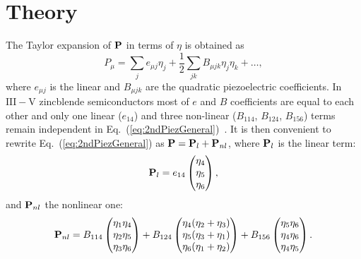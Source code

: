





\section{Theory}

The Taylor expansion of ${\bf P}$ in terms of $\eta$ is obtained as
%
\begin{equation}
\label{eq:2ndPiezGeneral}
P_{\mu}=\sum_je_{\mu j}\eta_j+\frac{1}{2}\sum_{jk}B_{\mu jk}\eta_j\eta_k+\dots,
\end{equation}
%
where $e_{\mu j}$ is the linear and $B_{\mu jk}$ are the quadratic piezoelectric coefficients. In $\mathrm{III-V}$ zincblende semiconductors most of $e$ and $B$ coefficients are equal to each other and only one linear ($e_{14}$) and three non-linear ($B_{114}$, $B_{124}$, $B_{156}$) terms remain independent in Eq.~(\ref{eq:2ndPiezGeneral})~\cite{Beya-Wakata2011}. It is then convenient to rewrite Eq.~(\ref{eq:2ndPiezGeneral}) as ${\bf P}={\bf P}_{l}+{\bf P}_{nl}$, where ${\bf P}_{l}$ is the linear term:
%
%
\begin{equation}
\label{eq:1stPiez}
{\bf P}_{l}=e_{14}\begin{pmatrix}\eta_4\\\eta_5\\\eta_6\end{pmatrix},
\end{equation}
%
and ${\bf P}_{nl}$ the nonlinear one:
%
\begin{equation}
\label{eq:2ndPiez}
{\bf P}_{nl}=B_{114}\begin{pmatrix}\eta_1\eta_4\\\eta_2\eta_5\\\eta_3\eta_6\end{pmatrix}+
B_{124}\begin{pmatrix}\eta_4(\eta_2+\eta_3)\\\eta_5(\eta_3+\eta_1)\\\eta_6(\eta_1+\eta_2)\end{pmatrix}+
B_{156}\begin{pmatrix}\eta_5\eta_6\\\eta_4\eta_6\\\eta_4\eta_5\end{pmatrix}.
\end{equation}
